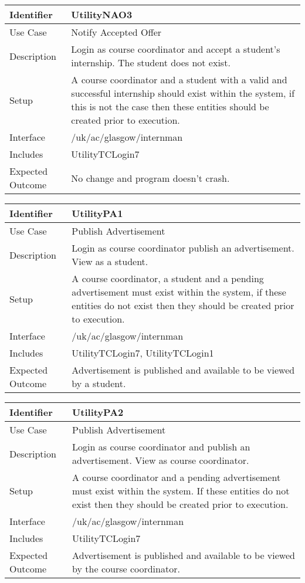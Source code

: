 \vspace{2em}

\begin{tabularx}{\textwidth}{|T|L|}
\hline
Identifier & UtilityNAO3\\
\hline
Use Case & Notify Accepted Offer \\
\hline
Description & Login as course coordinator and accept a student's internship.
The student does not exist.\\
\hline
Setup & A course coordinator and a student with a valid and successful
internship should exist within the system, if this is not the case
then these entities should be created prior to execution.\\
\hline
Interface & /uk/ac/glasgow/internman \\
\hline
Includes & UtilityTCLogin7 \\
\hline
Expected Outcome & No change and program doesn't crash.\\
\hline
\end{tabularx}

\vspace{2em}

\begin{tabularx}{\textwidth}{|T|L|}
\hline
Identifier & UtilityPA1\\
\hline
Use Case & Publish Advertisement \\
\hline
Description & Login as course coordinator publish an
advertisement. View as a student. \\
\hline
Setup & A course coordinator, a student and a pending advertisement
must exist within the system, if these entities do not exist then they
should be created prior to execution. \\
\hline
Interface & /uk/ac/glasgow/internman \\
\hline
Includes & UtilityTCLogin7, UtilityTCLogin1 \\
\hline
Expected Outcome & Advertisement is published and available to be viewed by
a student.\\
\hline
\end{tabularx}

\vspace{2em}

\begin{tabularx}{\textwidth}{|T|L|}
\hline
Identifier & UtilityPA2\\
\hline
Use Case & Publish Advertisement \\
\hline
Description & Login as course coordinator and publish an
advertisement. View as course coordinator.\\
\hline
Setup & A course coordinator and a pending advertisement must exist
within the system. If these entities do not exist then they should be
created prior to execution. \\
\hline
Interface & /uk/ac/glasgow/internman \\
\hline
Includes & UtilityTCLogin7 \\
\hline
Expected Outcome & Advertisement is published and available to be viewed by the
course coordinator.\\
\hline
\end{tabularx}

